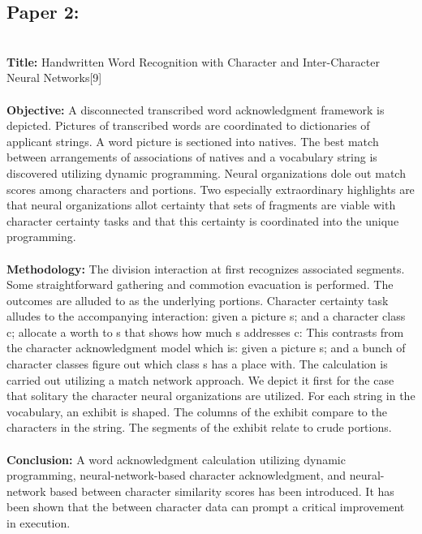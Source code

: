 \documentclass[12pt, conference]{IEEEtran}
\begin{document}
\subsection{\textbf{Paper 2:}}
\textbf{}\\
\textbf{Title:} Handwritten Word Recognition with Character and Inter-Character Neural Networks[9]\\
\textbf{}\\
\textbf{Objective:} A disconnected transcribed word acknowledgment framework is depicted. Pictures of transcribed words are coordinated to dictionaries of applicant strings. A word picture is sectioned into natives. The best match between arrangements of associations of natives and a vocabulary string is discovered utilizing dynamic programming. Neural organizations dole out match scores among characters and portions. Two especially extraordinary highlights are that neural organizations allot certainty that sets of fragments are viable with character certainty tasks and that this certainty is coordinated into the unique programming.\\
\textbf{}\\
\textbf{Methodology:} The division interaction at first recognizes associated segments. Some straightforward gathering and commotion evacuation is performed. The outcomes are alluded to as the underlying portions. Character certainty task alludes to the accompanying interaction: given a picture s; and a character class c; allocate a worth to s that shows how much s addresses c: This contrasts from the character acknowledgment model which is: given a picture s; and a bunch of character classes figure out which class s has a place with. The calculation is carried out utilizing a match network approach. We depict it first for the case that solitary the character neural organizations are utilized. For each string in the vocabulary, an exhibit is shaped. The columns of the exhibit compare to the characters in the string. The segments of the exhibit relate to crude portions.\\
\textbf{}\\
\textbf{Conclusion:} A word acknowledgment calculation utilizing dynamic programming, neural-network-based character acknowledgment, and neural-network based between character similarity scores has been introduced. It has been shown that the between character data can prompt a critical improvement in execution.\\
\end{document}
